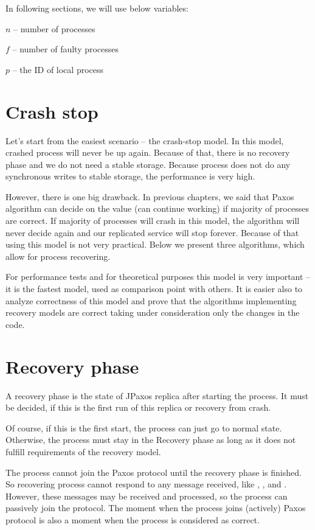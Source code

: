 In following sections, we will use below variables: 
\begin{tightList}
  \item[$n$] -- number of processes
  \item[$f$] -- number of faulty processes
  \item[$p$] -- the ID of local process
\end{tightList}

\section{Crash stop}
\label{sec:crash_stop}

Let's start from the easiest scenario -- the crash-stop model. In this model, crashed process will never be up again.
Because of that, there is no recovery phase and we do not need a stable storage. Because process does not do any synchronous writes to stable storage, the performance is very high. 

However, there is one big drawback. In previous chapters, we said that Paxos algorithm can decide on the value (can continue working) if majority of processes are correct. If majority of processes will crash in this model, the algorithm will never decide again and our replicated service will stop forever. Because of that using this model is not very practical. Below we present three algorithms, which allow for process recovering.

For performance tests and for theoretical purposes this model is very important -- it is the fastest model, used as comparison point with others. It is easier also to analyze correctness of this model and prove that the algorithms implementing recovery models are correct taking under consideration only the changes in the code.

\section{Recovery phase}

A recovery phase is the state of JPaxos replica after starting the process. It must be decided, if this is the first run of this replica or recovery from crash.

Of course, if this is the first start, the process can just go to normal state. Otherwise, the process must stay in the Recovery phase as long as it does not fulfill requirements of the recovery model.

The process cannot join the Paxos protocol until the recovery phase is finished. \linebreak So recovering process cannot respond to any message received, like \propose[], \accept[], \prepare and \prepareOK[]. However, these messages may be received and processed, so the process can passively join the protocol. The moment when the process joins (actively) Paxos protocol is also a moment when the process is considered as correct.



